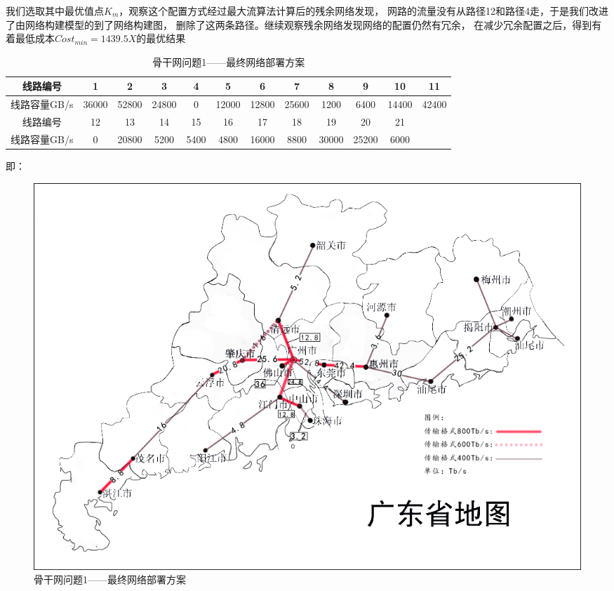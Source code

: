 \documentclass[UTF8,12pt]{ctexart}
\begin{document}
     我们选取其中最优值点$K_m$，观察这个配置方式经过最大流算法计算后的残余网络发现，
     网路的流量没有从路径12和路径4走，于是我们改进了由网络构建模型的到了网络构建图，
     删除了这两条路径。继续观察残余网络发现网络的配置仍然有冗余，
     在减少冗余配置之后，得到有着最低成本$Cost_{min}=1439.5X$的最优结果
           \begin{table}[htbp]
            \centering
            \caption{骨干网问题1——最终网络部署方案}
              \begin{scriptsize}
                  
              \begin{tabular}{cccccccccccc}
              \toprule
              线路编号   & 1      & 2      & 3      & 4      & 5      & 6      & 7      & 8      & 9      & 10     & 11 \\
              \midrule
              线路容量GB/s & 36000  & 52800  & 24800  & 0      & 12000  & 12800  & 25600  & 1200   & 6400   & 14400  & 42400 \\
              \midrule
              线路编号   & 12     & 13     & 14     & 15     & 16     & 17     & 18     & 19     & 20     & 21     &  \\
              \midrule
              线路容量GB/s & 0      & 20800  & 5200   & 5400   & 4800   & 16000  & 8800   & 30000  & 25200  & 6000   &  \\
              \bottomrule
              \end{tabular}
            \end{scriptsize}
          \end{table}%
    
            即：\par
            \begin{figure}[H]
                \centering
                \includegraphics[scale=0.4]{overG1.png}   %
                \caption{骨干网问题1——最终网络部署方案}
                \end{figure} 
\end{document}
